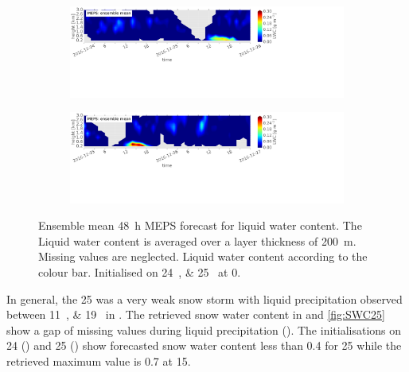 \begin{figure}[t]
	\centering
	\begin{subfigure}[b]{\textwidth}
		\centering
		\includegraphics[trim={0.cm 11.5cm 18.5cm 0.4cm},clip,width=\textwidth]{./fig_vert_LWC_EM/20161224}
		\caption{}\label{fig:LWC:24}
	\end{subfigure}
	\begin{subfigure}[b]{\textwidth}
		\centering
		\includegraphics[trim={0.cm 10cm 18.5cm 0.4cm},clip,width=\textwidth]{./fig_vert_LWC_EM/20161225}
		\caption{}\label{fig:LWC:25}
	\end{subfigure}
	\caption{Ensemble mean \SI{48}{\hour} MEPS forecast for liquid water content. The Liquid water content is averaged over a layer thickness of \SI{200}{\metre}.  Missing values are neglected. Liquid water content according to the colour bar.
		Initialised on \SIlist{24;25}{\dec} at \SI{0}{\UTC}. 
	}\label{fig:LWC:2425}
\end{figure}
\noindent
In general, the \SI{25}{\dec} was a very weak snow storm with liquid precipitation observed between \SIlist{11;19}{\UTC} in . The retrieved snow water content in  and \ref{fig:SWC25} show a gap of missing values during liquid precipitation ().
The initialisations on \num{24} () and \SI{25}{\dec} () show forecasted snow water content less than \SI{0.4}{\SWC} for \SI{25}{\dec} while the retrieved maximum value is \SI{0.7}{\SWC} at \SI{15}{\UTC}.
